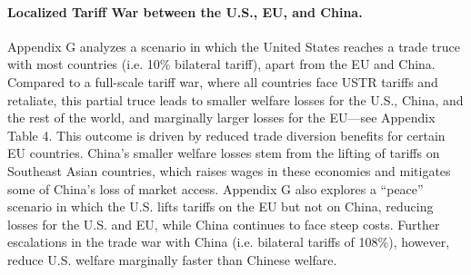 \documentclass[12pt]{article}
\begin{document}
\paragraph{Localized Tariff War between the U.S., EU, and China.}
Appendix G analyzes a scenario in which the United States reaches a trade truce with most countries (i.e. 10\% bilateral tariff), apart from the EU and China. %
Compared to a full-scale tariff war, where all countries face USTR tariffs and retaliate, this partial truce leads to smaller welfare losses for the U.S., China, and the rest of the world, and marginally larger losses for the EU---see Appendix Table 4. This outcome is driven by reduced trade diversion benefits for certain EU countries. China's smaller welfare losses stem from the lifting of tariffs on Southeast Asian countries, which raises wages in these economies and mitigates some of China's loss of market access. Appendix G also explores a ``peace'' scenario in which the U.S. lifts tariffs on the EU but not on China, reducing losses for the U.S. and EU, while China continues to face steep costs. Further escalations in the trade war with China (i.e. bilateral tariffs of 108\%), however, reduce U.S. welfare marginally faster than Chinese welfare. %

\end{document}
